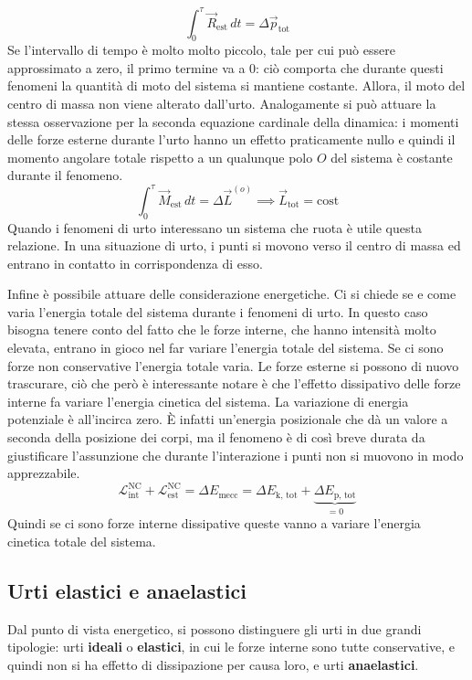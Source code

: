 \documentclass[10pt,a4paper]{book}
\begin{document}
\[
	\int_0^\tau \vec{R}_\text{est}\,dt=\Delta \vec{p}_\text{tot}
\]
Se l'intervallo di tempo è molto molto piccolo, tale per cui può essere approssimato a zero, il primo termine va a 0: ciò comporta che durante questi fenomeni la quantità di moto del sistema si mantiene costante. Allora, il moto del centro di massa non viene alterato dall'urto. Analogamente si può attuare la stessa osservazione per la seconda equazione cardinale della dinamica: i momenti delle forze esterne durante l'urto hanno un effetto praticamente nullo e quindi il momento angolare totale rispetto a un qualunque polo $O$ del sistema è costante durante il fenomeno.
\[
	\int_0^\tau \vec{M}_\text{est}\,dt=\Delta \vec{L}^{(o)} \implies \vec{L}_\text{tot}=\text{cost}
\]
Quando i fenomeni di urto interessano un sistema che ruota è utile questa relazione. In una situazione di urto, i punti si movono verso il centro di massa ed entrano in contatto in corrispondenza di esso.

Infine è possibile attuare delle considerazione energetiche. Ci si chiede se e come varia l'energia totale del sistema durante i fenomeni di urto. In questo caso bisogna tenere conto del fatto che le forze interne, che hanno intensità molto elevata, entrano in gioco nel far variare l'energia totale del sistema. Se ci sono forze non conservative l'energia totale varia. Le forze esterne si possono di nuovo trascurare, ciò che però è interessante notare è che l'effetto dissipativo delle forze interne fa variare l'energia cinetica del sistema. La variazione di energia potenziale è all'incirca zero. È infatti un'energia posizionale che dà un valore a seconda della posizione dei corpi, ma il fenomeno è di così breve durata da giustificare l'assunzione che durante l'interazione i punti non si muovono in modo apprezzabile.
\[
	\mathcal{L}_\text{int}^\text{NC}+\mathcal{L}_\text{est}^\text{NC}=\Delta E_\text{mecc}=\Delta E_\text{k, tot}+\underbrace{\Delta E_\text{p, tot}}_{=0}
\]
Quindi se ci sono forze interne dissipative queste vanno a variare l'energia cinetica totale del sistema.

\subsection{Urti elastici e anaelastici}

Dal punto di vista energetico, si possono distinguere gli urti in due grandi tipologie: urti \textbf{ideali} o \textbf{elastici}, in cui le forze interne sono tutte conservative, e quindi non si ha effetto di dissipazione per causa loro, e urti \textbf{anaelastici}.
\end{document}
